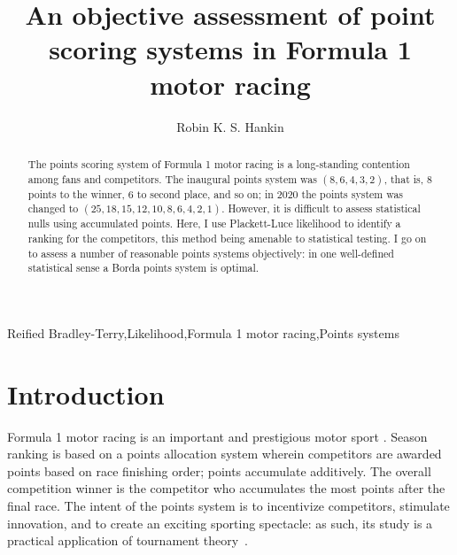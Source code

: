 \documentclass{elsarticle}
\begin{document}
\begin{frontmatter}
  \title{An objective assessment of point scoring systems in Formula 1 motor racing}
  \author{Robin K. S. Hankin}
  \address{AUT University, 55 Wellesley Street, Auckland 1010, New Zealand\\
  }


\begin{abstract}
The points scoring system of Formula 1 motor racing is a long-standing
contention among fans and competitors.  The inaugural points system
was $(8,6,4,3,2)$, that is, 8 points to the winner, 6 to second place,
and so on; in 2020 the points system was changed to
$(25,18,15,12,10,8,6,4,2,1)$.  However, it is difficult to assess
statistical nulls using accumulated points.  Here, I use Plackett-Luce
likelihood to identify a ranking for the competitors, this method
being amenable to statistical testing.  I go on to assess a number of
reasonable points systems objectively: in one well-defined statistical
sense a Borda points system is optimal.
\end{abstract}
\begin{keyword}
Reified Bradley-Terry\sep Likelihood\sep Formula 1 motor racing\sep Points systems
\end{keyword}


\end{frontmatter}
\linenumbers

\newcommand{\raik}{R\"{a}ikk\"{o}nen}

\section{Introduction}\label{introduction}
Formula 1 motor racing is an important and prestigious motor sport
\citep{codling2017,jenkins2010}.  Season ranking is based on a points
allocation system wherein competitors are awarded points based on race
finishing order; points accumulate additively.  The overall
competition winner is the competitor who accumulates the most points
after the final race.  The intent of the points system is to
incentivize competitors, stimulate innovation, and to create an
exciting sporting spectacle: as such, its study is a practical
application of tournament theory~\citep{lazear1981}.
\end{document}
